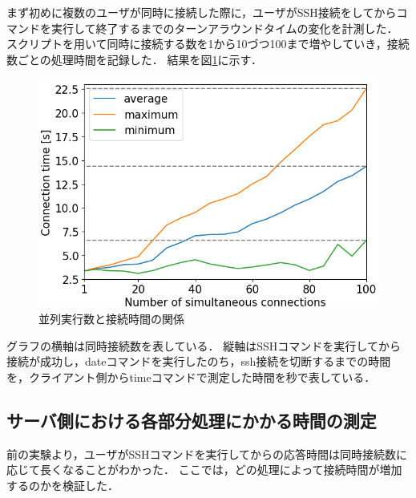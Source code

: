 \documentclass[dvipdfmx]{cs-handout}
\begin{document}
まず初めに複数のユーザが同時に接続した際に，ユーザがSSH接続をしてからコマンドを実行して終了するまでのターンアラウンドタイムの変化を計測した．
スクリプトを用いて同時に接続する数を1から10づつ100まで増やしていき，接続数ごとの処理時間を記録した．
結果を図\ref{fig:connect}に示す．
%
%
%
\begin{figure}[tb]
\includegraphics[width=0.9\linewidth]{./fig/connect.png}
\caption{並列実行数と接続時間の関係}
\label{fig:connect}
\end{figure}

グラフの横軸は同時接続数を表している．
縦軸はSSHコマンドを実行してから接続が成功し，dateコマンドを実行したのち，ssh接続を切断するまでの時間を，クライアント側からtimeコマンドで測定した時間を秒で表している．

\subsection{サーバ側における各部分処理にかかる時間の測定}

前の実験より，ユーザがSSHコマンドを実行してからの応答時間は同時接続数に応じて長くなることがわかった．
ここでは，どの処理によって接続時間が増加するのかを検証した．
\end{document}
